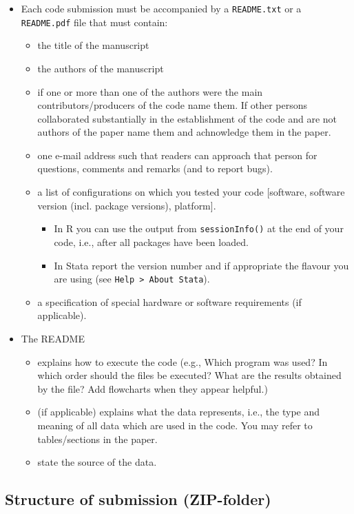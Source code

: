 \documentclass[12pt,a4paper]{article}
\begin{document}
\begin{itemize}
\item Each code submission {must} be accompanied by a \texttt{README.txt} or a
  \texttt{README.pdf} file that must contain:
  \begin{itemize}
  \item the title of the manuscript
  \item the authors of the manuscript
  \item if one or more than one of the authors were the main contributors/producers
    of the code name them. If other persons collaborated substantially in the
    establishment of the code and are not authors of the paper name them and
    achnowledge them in the paper.
  \item one e-mail address such that readers can approach that person for
    questions, comments and remarks (and to report bugs).
  \item a list of configurations on which you tested your code [software,
    software version (incl. package versions), platform].
    \begin{itemize}
    \item In \textsf{R} you can use the output from \texttt{sessionInfo()} at
      the end of your code, i.e., after all packages have been loaded.
    \item In \textsf{Stata} report the version number and if appropriate the
      flavour you are using (see \texttt{Help > About Stata}).
    \end{itemize}
  \item a specification of special hardware or software requirements (if
    applicable).
  \end{itemize}
  \item The README
  \begin{itemize}
  \item explains how to execute the code (e.g., Which program was used? In which
    order should the files be executed? What are the results obtained by the
    file? Add flowcharts when they appear helpful.)
  \item (if applicable) explains what the data represents, i.e., the type and
    meaning of all data which are used in the code. You may refer to
    tables/sections in the paper.
  \item state the source of the data.
  \end{itemize}
\end{itemize}

\subsection{Structure of submission (ZIP-folder)}\label{sec:structure}
\end{document}
